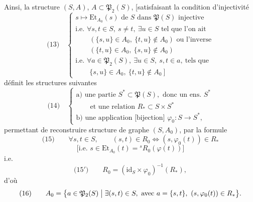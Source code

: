 \documentclass[11pt,a4paper]{article}
\begin{document}
Ainsi, la structure  $(S, A)$,
$A \subset \mathfrak{P}_2(S)$, [satisfaisant la condition d'injectivité
\[
\text{(13)}\quad
\begin{cases}
s \longmapsto \mathrm{Et}_{A_0}(s) \text{ de } S \text{ dans } \mathfrak{P}(S) \text{ injective}\\
\text{i.e. } \forall s,t \in S ,\ s \neq t ,\ \exists u \in S \text{ tel que l'on ait}\\
\qquad (\{s,u\} \in A_0 ,\ \{t,u\} \notin A_0) \text{ ou l'inverse}\\
\qquad (\{t,u\} \in A_0 ,\ \{s,u\} \notin A_0)\\
\text{i.e. } \forall a \in \mathfrak{P}_2(S) ,\ \exists u \in S ,\ s,t \in a ,\ \text{tels que}\\
\qquad \{s,u\} \in A_0 ,\ \{t,u\} \notin A_0 \ ]
\end{cases}
\]
définit les structures suivantes
\[
\text{(14)}\quad
\begin{cases}
\text{a) une partie } S^{*} \subset \mathfrak{P}(S) , \text{ donc un ens. } S^{*}\\
\qquad \text{et une relation } R_{*} \subset S \times S^{*}\\
\text{b) une application [bijection] } \varphi_0 : S \longrightarrow S^{*} ,
\end{cases}
\]
 permettant de reconstruire
 structure de graphe $(S, A_0)$, par la formule
\[
\text{(15)} \qquad \forall s,t \in S , \qquad
(s,t) \in R_0 \iff (s, \varphi_0(t)) \in R_{*}
\]
\[
\bigl[\text{i.e. } s \in \mathrm{Et}_{A_0}(t) = {}^{s}R_0(\varphi(t)) \bigr]
\]
i.e.
\[
\text{(15$'$)} \qquad R_0 = (\mathrm{id}_S \times \varphi_0)^{-1}(R_{*}) ,
\]
d'où
\[
\text{(16)} \qquad A_0 = \bigl\{ a \in \mathfrak{P}_2(S) \bigm| \exists (s,t) \in S ,
\text{ avec } a = \{s,t\} ,\ (s, \varphi_0(t)) \in R_{*} \bigr\} .
\]
\end{document}
